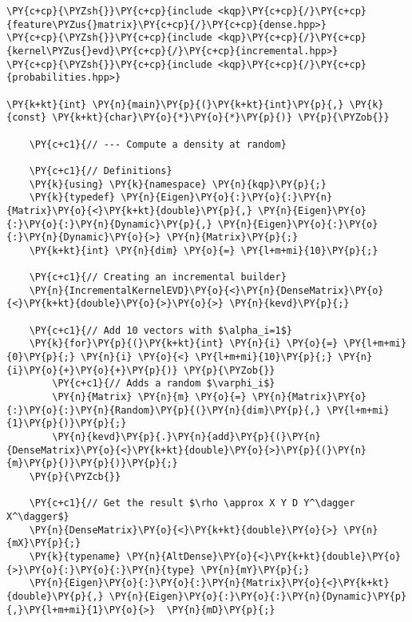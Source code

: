 \begin{Verbatim}[commandchars=\\\{\},codes={\catcode`\$=3\catcode`\^=7\catcode`\_=8}]
\PY{c+cp}{\PYZsh{}}\PY{c+cp}{include <kqp}\PY{c+cp}{/}\PY{c+cp}{feature\PYZus{}matrix}\PY{c+cp}{/}\PY{c+cp}{dense.hpp>}
\PY{c+cp}{\PYZsh{}}\PY{c+cp}{include <kqp}\PY{c+cp}{/}\PY{c+cp}{kernel\PYZus{}evd}\PY{c+cp}{/}\PY{c+cp}{incremental.hpp>}
\PY{c+cp}{\PYZsh{}}\PY{c+cp}{include <kqp}\PY{c+cp}{/}\PY{c+cp}{probabilities.hpp>}

\PY{k+kt}{int} \PY{n}{main}\PY{p}{(}\PY{k+kt}{int}\PY{p}{,} \PY{k}{const} \PY{k+kt}{char}\PY{o}{*}\PY{o}{*}\PY{p}{)} \PY{p}{\PYZob{}}
    
    \PY{c+c1}{// --- Compute a density at random}
    
    \PY{c+c1}{// Definitions}
    \PY{k}{using} \PY{k}{namespace} \PY{n}{kqp}\PY{p}{;}
    \PY{k}{typedef} \PY{n}{Eigen}\PY{o}{:}\PY{o}{:}\PY{n}{Matrix}\PY{o}{<}\PY{k+kt}{double}\PY{p}{,} \PY{n}{Eigen}\PY{o}{:}\PY{o}{:}\PY{n}{Dynamic}\PY{p}{,} \PY{n}{Eigen}\PY{o}{:}\PY{o}{:}\PY{n}{Dynamic}\PY{o}{>} \PY{n}{Matrix}\PY{p}{;}
    \PY{k+kt}{int} \PY{n}{dim} \PY{o}{=} \PY{l+m+mi}{10}\PY{p}{;}
    
    \PY{c+c1}{// Creating an incremental builder}
    \PY{n}{IncrementalKernelEVD}\PY{o}{<}\PY{n}{DenseMatrix}\PY{o}{<}\PY{k+kt}{double}\PY{o}{>}\PY{o}{>} \PY{n}{kevd}\PY{p}{;}
    
    \PY{c+c1}{// Add 10 vectors with $\alpha_i=1$}
    \PY{k}{for}\PY{p}{(}\PY{k+kt}{int} \PY{n}{i} \PY{o}{=} \PY{l+m+mi}{0}\PY{p}{;} \PY{n}{i} \PY{o}{<} \PY{l+m+mi}{10}\PY{p}{;} \PY{n}{i}\PY{o}{+}\PY{o}{+}\PY{p}{)} \PY{p}{\PYZob{}}
        \PY{c+c1}{// Adds a random $\varphi_i$}
        \PY{n}{Matrix} \PY{n}{m} \PY{o}{=} \PY{n}{Matrix}\PY{o}{:}\PY{o}{:}\PY{n}{Random}\PY{p}{(}\PY{n}{dim}\PY{p}{,} \PY{l+m+mi}{1}\PY{p}{)}\PY{p}{;}
        \PY{n}{kevd}\PY{p}{.}\PY{n}{add}\PY{p}{(}\PY{n}{DenseMatrix}\PY{o}{<}\PY{k+kt}{double}\PY{o}{>}\PY{p}{(}\PY{n}{m}\PY{p}{)}\PY{p}{)}\PY{p}{;}
    \PY{p}{\PYZcb{}}
    
    \PY{c+c1}{// Get the result $\rho \approx X Y D Y^\dagger X^\dagger$}
    \PY{n}{DenseMatrix}\PY{o}{<}\PY{k+kt}{double}\PY{o}{>} \PY{n}{mX}\PY{p}{;}
    \PY{k}{typename} \PY{n}{AltDense}\PY{o}{<}\PY{k+kt}{double}\PY{o}{>}\PY{o}{:}\PY{o}{:}\PY{n}{type} \PY{n}{mY}\PY{p}{;}
    \PY{n}{Eigen}\PY{o}{:}\PY{o}{:}\PY{n}{Matrix}\PY{o}{<}\PY{k+kt}{double}\PY{p}{,} \PY{n}{Eigen}\PY{o}{:}\PY{o}{:}\PY{n}{Dynamic}\PY{p}{,}\PY{l+m+mi}{1}\PY{o}{>}  \PY{n}{mD}\PY{p}{;}
    

\end{Verbatim}
